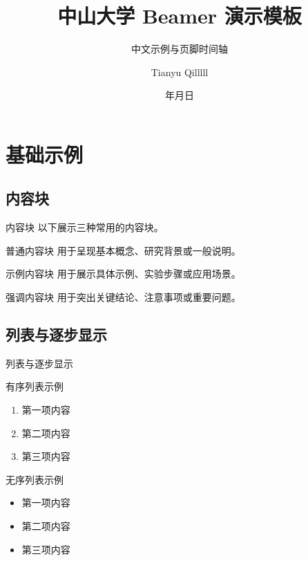 \documentclass[10pt,aspectratio=169]{beamer}
\title{中山大学 Beamer 演示模板}
\subtitle{中文示例与页脚时间轴}
\author[TY.Qi]{Tianyu Qilllll}
\institute[中山大学]{网络空间安全学院\\中山大学}
\date{\number\year 年\number\month 月\number\day 日}
\begin{document}
\maketitle


\section{基础示例}

\subsection{内容块}
\begin{frame}[c]{内容块}
  以下展示三种常用的内容块。
  \begin{block}{普通内容块}
    用于呈现基本概念、研究背景或一般说明。
  \end{block}
  \begin{exampleblock}{示例内容块}
    用于展示具体示例、实验步骤或应用场景。
  \end{exampleblock}
  \begin{alertblock}{强调内容块}
    用于突出关键结论、注意事项或重要问题。
  \end{alertblock}
\end{frame}

\subsection[列表与动画]{列表与逐步显示}
\begin{frame}[c]{列表与逐步显示}

  {\large 有序列表示例}
  \begin{enumerate}[<+->]
    \item 第一项内容
    \item 第二项内容
    \item 第三项内容
  \end{enumerate}
  \vfill
  {\large 无序列表示例}
  \begin{itemize}[<+->]
    \item 第一项内容
    \item 第二项内容
    \item 第三项内容
  \end{itemize}
\end{frame}
\end{document}
